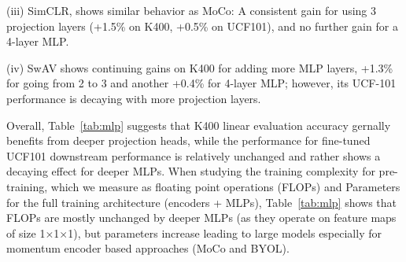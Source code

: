 \documentclass[final]{cvpr}
\newcommand{\tblref}[1]{Table~\ref{#1}}
\def\x{$\times$}
\begin{document}
(iii) SimCLR, shows similar behavior as MoCo: A consistent gain for using 3 projection layers (+1.5\% on K400, +0.5\% on UCF101), and no further gain for a 4-layer MLP.

(iv) SwAV shows continuing gains on K400 for adding more MLP layers, +1.3\% for going from 2 to 3 and another +0.4\% for 4-layer MLP; however, its UCF-101 performance is decaying with more projection layers. 

Overall,  \tblref{tab:mlp}  suggests that K400 linear evaluation accuracy gernally benefits from deeper projection heads, while the performance for fine-tuned UCF101 downstream performance is relatively unchanged and rather shows a decaying effect for deeper MLPs. 
When studying the training complexity for pre-training, which we measure as floating point operations (FLOPs) and Parameters for the full training architecture (encoders + MLPs),  \tblref{tab:mlp}  shows that FLOPs are mostly unchanged by deeper MLPs (as they operate on feature maps of size 1\x 1\x 1), but parameters increase leading to large models especially for momentum encoder based approaches (MoCo and BYOL). 
\end{document}
